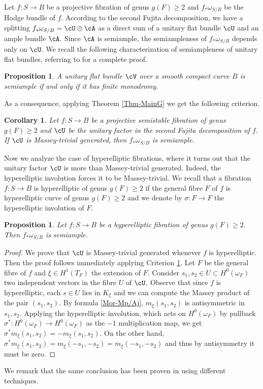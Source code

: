 \documentclass[a4paper,11pt]{amsart}
\newtheorem{corollary}[theorem]{Corollary}
\newtheorem{proposition}[theorem]{Proposition}
\begin{document}
{ 					 			Let $f:S\to B$ be a projective fibration of genus $g(F)\geq 2$ and $f_*\omega_{S/B}$ be the Hodge bundle of $f$. According to the second Fujita decomposition, we have a splitting  $f_*\omega_{S/B}= \cU\oplus \cA$ as a direct sum of a unitary flat bundle $\cU$ and an ample bundle $\cA.$ Since $\cA$ is semiample, the semiampleness of $f_*\omega_{S/B}$ depends only on $\cU.$ We recall the following characterization of semiampleness of unitary flat bundles, referring to \cite{CD:Answer_2017} for a complete proof.
 					 			\begin{proposition} A unitary flat bundle $\cV$ over a smooth compact curve $B$ is semiample if and only if it has finite monodromy. 
 					 				\end{proposition}
 					 			As a consequence, applying Theorem \ref{Thm-MainG} we get the following criterion.
 					 			\begin{corollary}\label{Cor-SemiamplenessCriteria} Let $f:S\to B$ be a projective semistable fibration of genus $g(F)\geq 2$ and $\cU$ be the unitary factor in the second Fujita decomposition of $f.$ If $\cU$ is Massey-trivial generated, then $f_*\omega_{S/B}$ is semiample.
 					 			\end{corollary}
 					 			Now we analyze the case of hyperelliptic fibrations, where it turns out that the unitary factor $\cU$ is more than Massey-trivial generated. Indeed, the hyperelliptic involution forces it to be Massey-trivial. We recall that a fibration $f:S\to B$ is hyperelliptic of genus $g(F)\geq 2$ if the general fibre $F$ of $f$ is hyperelliptic curve of genus $g(F)\geq 2$ and we denote by $\sigma: F\to F$ the hyperelliptic involution of $F.$  
 					 			\begin{proposition}\label{Prop-HyperellipticApplication} Let $f:S\to B$ be a hyperelliptic fibration of genus $g(F)\geq 2.$ Then $f_*\omega_{S/B}$ is semiample. 
 					 				\end{proposition}
 					 				\begin{proof} We prove that $\cU$ is Massey-trivial generated whenever $f$ is hyperelliptic. Then the proof follows immediately applying Criterion \ref{Cor-SemiamplenessCriteria}. Let $F$ be the general fibre of $f$ and $\xi\in H^1(T_F)$ the extension of $F.$ Consider $s_1,s_2\in U\subset H^0(\omega_F)$ two independent vectors in the fibre $U$ of $\cU.$ Observe that since $f$ is hyperelliptic, each $s\in U$ lies in $K_\xi$ and we can compute the Massey product of the pair $(s_1,s_2).$ By formula \eqref{Mor-Mp/Aj}, $m_{\xi}(s_1,s_2 )$ is antisymmetric in $s_1,s_2.$ Applying the hyperelliptic involution, which acts on $H^0(\omega_F)$ by pullback  $\sigma^*:H^0(\omega_F)\to H^0(\omega_F)$ as the $-1$ multiplication map, 
									we get $\sigma^*m_{\xi}(s_1,s_2 )=-m_{\xi}(s_1,s_2 ).$ On the other hand, $\sigma^*m_{\xi}(s_1,s_2 )=m_{\xi}(-s_1,-s_2 )=m_{\xi}(-s_1,-s_2 )$ and thus by antisymmetry it must be zero.     
 					 					\end{proof}
 					 					We remark that the same conclusion has been proven in \cite{LuZuo_OnTheSlope_2017} using different techniques.
 					 			
}
\end{document}
